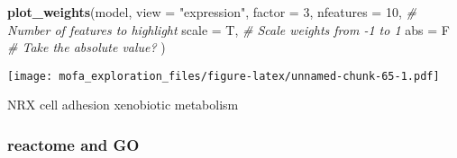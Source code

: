 \documentclass[
]{article}
\newenvironment{Shaded}{\begin{snugshade}}{\end{snugshade}}
\newcommand{\CommentTok}[1]{\textcolor[rgb]{0.56,0.35,0.01}{\textit{#1}}}
\newcommand{\DataTypeTok}[1]{\textcolor[rgb]{0.13,0.29,0.53}{#1}}
\newcommand{\DecValTok}[1]{\textcolor[rgb]{0.00,0.00,0.81}{#1}}
\newcommand{\KeywordTok}[1]{\textcolor[rgb]{0.13,0.29,0.53}{\textbf{#1}}}
\newcommand{\NormalTok}[1]{#1}
\newcommand{\StringTok}[1]{\textcolor[rgb]{0.31,0.60,0.02}{#1}}
\begin{document}
\begin{Shaded}
\begin{Highlighting}[]
\KeywordTok{plot_weights}\NormalTok{(model,}
  \DataTypeTok{view =} \StringTok{"expression"}\NormalTok{,}
  \DataTypeTok{factor =} \DecValTok{3}\NormalTok{,}
  \DataTypeTok{nfeatures =} \DecValTok{10}\NormalTok{,     }\CommentTok{# Number of features to highlight}
  \DataTypeTok{scale =}\NormalTok{ T,          }\CommentTok{# Scale weights from -1 to 1}
  \DataTypeTok{abs =}\NormalTok{ F             }\CommentTok{# Take the absolute value?}
\NormalTok{)}
\end{Highlighting}
\end{Shaded}

\texttt{[image: mofa\_exploration\_files/figure-latex/unnamed-chunk-65-1.pdf]}

NRX cell adhesion xenobiotic metabolism

\hypertarget{reactome-and-go-1}{%
\subsubsection{reactome and GO}\label{reactome-and-go-1}}
\end{document}
